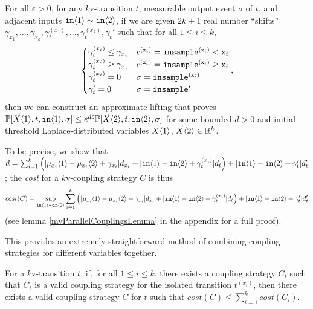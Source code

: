 \begin{lemma}\label{simplifiedMvParallelCouplingsLemma}
    For all $\varepsilon>0$, for any $k$v-transition $t$, measurable output event $\sigma$ of $t$, and adjacent inputs $\texttt{in}\brangle{1}\sim\texttt{in}\brangle{2}$, if we are given $2k+1$ real number ``shifts'' $\gamma_{x_1}, \ldots, \gamma_{x_k}, \gamma_t^{(x_1)}, \ldots, \gamma_t^{(x_k)}, \gamma_t'$ such that for all $1\leq i\leq k$, \[
        \begin{cases}
            \gamma_t^{(x_i)}\leq\gamma_{x_i} & c^{(\texttt{x}_i)} = \mvlguard[\texttt{x}_i]\\
            \gamma_t^{(x_i)}\geq\gamma_{x_i} & c^{(\texttt{x}_i)} = \mvgguard[\texttt{x}_i]\\
            \gamma_t^{(x_i)}=0 & \sigma = \texttt{insample}^{(\texttt{x}_i)}\\
            \gamma_t'=0 & \sigma = \texttt{insample}'
      \end{cases},
      \]
      then we can construct an approximate lifting that proves $\PP[\vec{X}\brangle{1}, t, \texttt{in}\brangle{1}, \sigma]\leq e^{d\varepsilon}\PP[\vec{X}\brangle{2}, t, \texttt{in}\brangle{2}, \sigma]$ for some bounded $d>0$ and initial threshold Laplace-distributed variables $\vec{X}\brangle{1}$, $\vec{X}\brangle{2}\in \RR^k$. 
\end{lemma}

To be precise, we show that $d = \sum_{i=1}^k\left(|\mu_{x_i}\brangle{1}-\mu_{x_i}\brangle{2}+\gamma_{x_i}|d_{x_i}+|\texttt{in}\brangle{1}-\texttt{in}\brangle{2}+\gamma_t^{(x_i)}|d_t\right)+|\texttt{in}\brangle{1}-\texttt{in}\brangle{2}+\gamma_t'|d_t'$;
the \textit{cost} for a $k$v-coupling strategy $C$ is thus \[cost(C) = \sup_{\texttt{in}\brangle{1}\sim\texttt{in}\brangle{2}}\sum_{i=1}^k\left(|\mu_{x_i}\brangle{1}-\mu_{x_i}\brangle{2}+\gamma_{x_i}|d_{x_i}+|\texttt{in}\brangle{1}-\texttt{in}\brangle{2}+\gamma_t^{(x_i)}|d_t\right)+|\texttt{in}\brangle{1}-\texttt{in}\brangle{2}+\gamma_t'|d_t'\] (see lemma \ref{mvParallelCouplingsLemma} in the appendix for a full proof).

This provides an extremely straightforward method of combining coupling strategies for different variables together.

\begin{cor}
    For a $k$v-transition $t$, if, for all $1\leq i\leq k$, there exists a coupling strategy $C_i$ such that $C_i$ is a valid coupling strategy for the isolated transition $t^{(x_i)}$, then there exists a valid coupling strategy $C$ for $t$ such that $cost(C)\leq \sum_{i=1}^k cost(C_i)$.
\end{cor}

